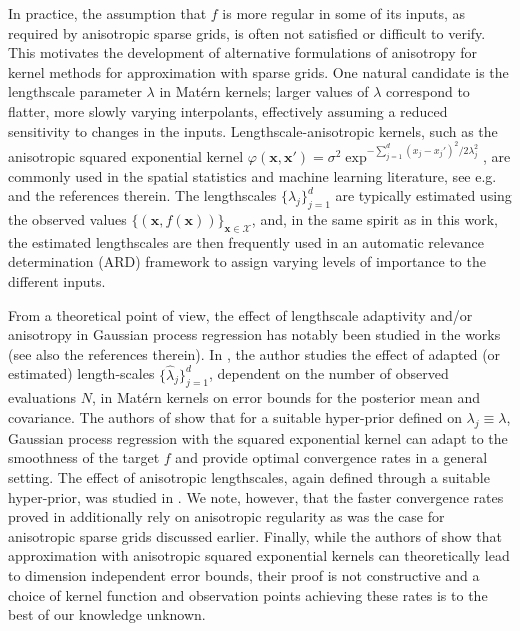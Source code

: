 \documentclass[pdflatex,sn-mathphys-num]{sn-jnl}%
\theoremstyle{thmstyleone}%
\theoremstyle{thmstyletwo}%
\theoremstyle{thmstylethree}%
\begin{document}
In practice, the assumption that $f$ is more regular in some of its inputs, as required by anisotropic sparse grids, is often not satisfied or difficult to verify. This motivates the development of alternative formulations of anisotropy for kernel methods for approximation with sparse grids. One natural candidate is the lengthscale parameter \(\lambda\) in Mat\'ern kernels; larger values of \(\lambda\) correspond to flatter, more slowly varying interpolants, effectively assuming a reduced sensitivity to changes in the inputs. Lengthscale-anisotropic kernels, such as the anisotropic squared exponential kernel $\varphi(\mathbf{x},\mathbf{x'}) = \sigma^2 \exp^{-\sum_{j=1}^{d} (x_j-x_j')^2/2\lambda_j^2}$, are commonly used in the spatial statistics and machine learning literature, see e.g. \cite{rasmussen2004gaussian,vanderVaart2009,Bhattacharya2014} and the references therein. The lengthscales $\{\lambda_j\}_{j=1}^d$ are typically estimated using the observed values \(\{(\mathbf{x},f(\mathbf{x}))\}_{\mathbf{x}\in\mathcal{X}}\), and, in the same spirit as in this work, the estimated lengthscales are then frequently used in an automatic relevance determination (ARD) framework \cite{mackay1992bayesian,neal2012bayesian,wipf2007new} to assign varying levels of importance to the different inputs.  

From a theoretical point of view, the effect of lengthscale adaptivity and/or anisotropy in Gaussian process regression has notably been studied in the works \cite{vanderVaart2009,fasshauer2012dimension, Bhattacharya2014,Teckentrup2020} (see also the references therein). In \cite{Teckentrup2020}, the author studies the effect of adapted (or estimated) length-scales $\{\widehat \lambda_j\}_{j=1}^d$, dependent on the number of observed evaluations $N$, in Mat\'ern kernels on error bounds for the posterior mean and covariance. The authors of \cite{vanderVaart2009} show that for a suitable hyper-prior defined on $\lambda_j \equiv \lambda$, Gaussian process regression with the squared exponential kernel can adapt to the smoothness of the target $f$ and provide optimal convergence rates in a general setting. The effect of anisotropic lengthscales, again defined through a suitable hyper-prior, was studied in \cite{Bhattacharya2014}. We note, however, that the faster convergence rates proved in \cite{Bhattacharya2014} additionally rely on anisotropic regularity as was the case for anisotropic sparse grids discussed earlier. Finally, while the authors of \cite{fasshauer2012dimension} show that approximation with anisotropic squared exponential kernels can theoretically lead to dimension independent error bounds, their proof is not constructive and a choice of kernel function and observation points achieving these rates is to the best of our knowledge unknown.
\end{document}
